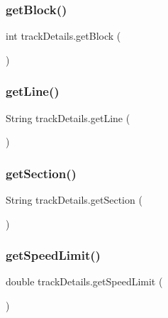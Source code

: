 \subsubsection{\texorpdfstring{get\+Block()}{getBlock()}}
{\footnotesize\ttfamily int track\+Details.\+get\+Block (\begin{DoxyParamCaption}{ }\end{DoxyParamCaption})}

\mbox{\label{classtrackDetails_a1d44908db14b13943285cb96a2650f39}} 
\subsubsection{\texorpdfstring{get\+Line()}{getLine()}}
{\footnotesize\ttfamily String track\+Details.\+get\+Line (\begin{DoxyParamCaption}{ }\end{DoxyParamCaption})}

\mbox{\label{classtrackDetails_a6015cc578bd221d08f86e7149bc628d4}} 
\subsubsection{\texorpdfstring{get\+Section()}{getSection()}}
{\footnotesize\ttfamily String track\+Details.\+get\+Section (\begin{DoxyParamCaption}{ }\end{DoxyParamCaption})}

\mbox{\label{classtrackDetails_ad98f82166c38d18a0b5ce5b58f302a35}} 
\subsubsection{\texorpdfstring{get\+Speed\+Limit()}{getSpeedLimit()}}
{\footnotesize\ttfamily double track\+Details.\+get\+Speed\+Limit (\begin{DoxyParamCaption}{ }\end{DoxyParamCaption})}

